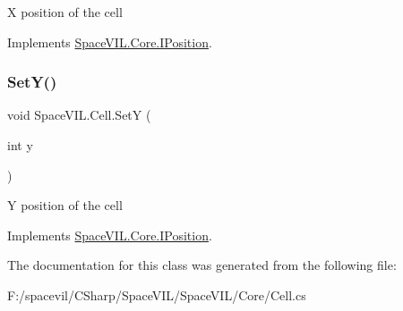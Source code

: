 X position of the cell 



Implements \mbox{\hyperlink{interface_space_v_i_l_1_1_core_1_1_i_position}{Space\+V\+I\+L.\+Core.\+I\+Position}}.

\mbox{\label{class_space_v_i_l_1_1_cell_a1876cc8c7d5b4ad383df1fe2330366f8}} 
\subsubsection{\texorpdfstring{Set\+Y()}{SetY()}}
{\footnotesize\ttfamily void Space\+V\+I\+L.\+Cell.\+SetY (\begin{DoxyParamCaption}\item[{int}]{y }\end{DoxyParamCaption})}



Y position of the cell 



Implements \mbox{\hyperlink{interface_space_v_i_l_1_1_core_1_1_i_position}{Space\+V\+I\+L.\+Core.\+I\+Position}}.



The documentation for this class was generated from the following file\+:\begin{DoxyCompactItemize}
\item 
F\+:/spacevil/\+C\+Sharp/\+Space\+V\+I\+L/\+Space\+V\+I\+L/\+Core/Cell.\+cs\end{DoxyCompactItemize}

